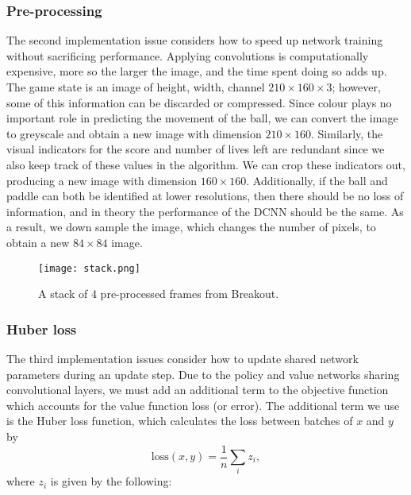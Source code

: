 \documentclass[12pt,a4paper]{article}
\begin{document}
\subsubsection{Pre-processing}
The second implementation issue considers how to speed up network training without sacrificing performance. Applying convolutions is computationally expensive, more so the larger the image, and the time spent doing so adds up. The game state is an image of height, width, channel $210 \times 160 \times 3$; however, some of this information can be discarded or compressed. Since colour plays no important role in predicting the movement of the ball, we can convert the image to greyscale and obtain a new image with dimension $210 \times 160$. Similarly, the visual indicators for the score and number of lives left are redundant since we also keep track of these values in the algorithm. We can crop these indicators out, producing a new image with dimension $160 \times 160$. Additionally, if the ball and paddle can both be identified at lower resolutions, then there should be no loss of information, and in theory the performance of the DCNN should be the same. As a result, we down sample the image, which changes the number of pixels, to obtain a new $84 \times 84$ image. 


\begin{figure}[ht]
    \centering
    \texttt{[image: stack.png]}
    \caption{A stack of 4 pre-processed frames from Breakout.}
  \end{figure}

\subsubsection{Huber loss}
The third implementation issues consider how to update shared network parameters during an update step. Due to the policy and value networks sharing convolutional layers, we must add an additional term to the objective function which accounts for the value function loss (or error). The additional term we use is the Huber loss function, which calculates the loss between batches of $x$ and $y$ by $$\text{loss}(x, y) = \frac{1}{n} \sum_{i} z_{i},$$ where $z_i$ is given by the following:
\end{document}
